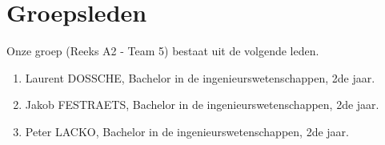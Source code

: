 \section{Groepsleden}
Onze groep (Reeks A2 - Team 5) bestaat uit de volgende leden.
\begin{enumerate}
 \item Laurent DOSSCHE, Bachelor in de ingenieurswetenschappen, 2de jaar.
 \item Jakob FESTRAETS, Bachelor in de ingenieurswetenschappen, 2de jaar.
 \item Peter LACKO, Bachelor in de ingenieurswetenschappen, 2de jaar.
\end{enumerate}
